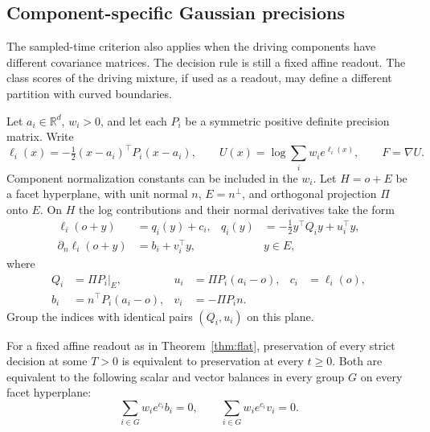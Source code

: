 \subsection{Component-specific Gaussian precisions}
\label{sec:heterogeneous}

The sampled-time criterion also applies when the driving components
have different covariance matrices. The decision rule is still a
fixed affine readout. The class scores of the driving mixture, if
used as a readout, may define a different partition with curved
boundaries.

Let $a_i\in\mathbb R^d$, $w_i>0$, and let each $P_i$ be a symmetric
positive definite precision matrix. Write
\[
 \ell_i(x)=-\tfrac12(x-a_i)^\top P_i(x-a_i),\qquad
 U(x)=\log\sum_i w_i e^{\ell_i(x)},\qquad F=\nabla U.
\]
Component normalization constants can be included in the $w_i$.
Let $H=o+E$ be a facet hyperplane, with unit normal $n$,
$E=n^\perp$, and orthogonal projection $\Pi$ onto $E$. On $H$
the log contributions and their normal derivatives take the form
\[
 \begin{aligned}
 \ell_i(o+y)&=q_i(y)+c_i, &
 q_i(y)&=-\tfrac12 y^\top Q_i y+u_i^\top y,\\
 \partial_n\ell_i(o+y)&=b_i+v_i^\top y, & & y\in E,
 \end{aligned}
\]
where
\[
 \begin{aligned}
 Q_i&=\Pi P_i|_E, &
 u_i&=\Pi P_i(a_i-o), &
 c_i&=\ell_i(o),\\
 b_i&=n^\top P_i(a_i-o), &
 v_i&=-\Pi P_i n.
 \end{aligned}
\]
Group the indices with identical pairs $(Q_i,u_i)$ on this plane.

\begin{theorem}
\label{thm:heterogeneous}
For a fixed affine readout as in Theorem~\ref{thm:flat}, preservation of
every strict decision at some $T>0$ is equivalent to preservation at
every $t\ge0$. Both are equivalent to the following scalar and vector
balances in every group $G$ on every facet hyperplane:
\begin{equation}
 \sum_{i\in G} w_i e^{c_i} b_i=0,\qquad
 \sum_{i\in G} w_i e^{c_i} v_i=0.
 \label{eq:heterogeneous-balance}
\end{equation}
\end{theorem}


